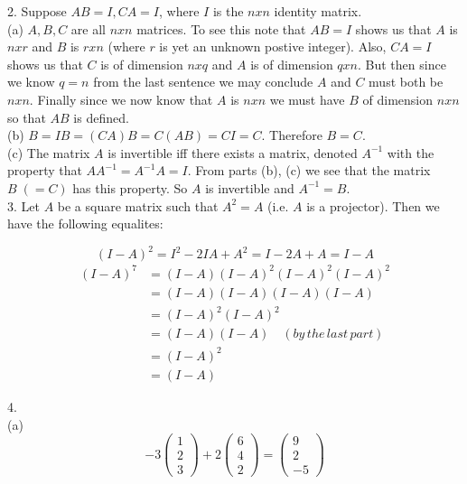 \documentclass[11pt]{article}
\begin{document}
2. Suppose $AB = I, CA = I$, where $I$ is the $nxn$ identity matrix.\\

(a) $A,B,C$ are all $nxn$ matrices. To see this note that $AB = I$ shows us that $A$ is $nxr$ and $B$ is $rxn$ (where $r$ is yet an unknown postive integer). Also, $CA = I$ shows us that $C$ is of dimension $nxq$ and $A$ is of dimension $qxn$. But then since we know $q=n$ from the last sentence we may conclude $A$ and $C$ must both be $nxn$. Finally since we now know that $A$ is $nxn$ we must have $B$ of dimension $nxn$ so that $AB$ is defined.\\

(b) $B = IB = (CA)B = C(AB) = CI = C$. Therefore $B = C$. \\

(c) The matrix $A$ is invertible iff there exists a matrix, denoted $A^{-1}$ with the property that $AA^{-1} = A^{-1}A = I$. From parts (b), (c) we see that the matrix $B \; (=C)$ has this property. So $A$ is invertible and $A^{-1} = B$.\\

3. Let $A$ be a square matrix such that $A^2 = A$ (i.e. $A$ is a projector). Then we have the following equalites:

$$ (I - A)^2 = I^2 - 2IA + A^2 = I - 2A + A = I - A$$
\begin{align*}
(I-A)^7 & = (I-A)(I-A)^2(I-A)^2(I-A)^2 \\ 
&= (I-A)(I-A)(I-A)(I-A) \\
&= (I-A)^2(I-A)^2 \\ 
&= (I-A)(I-A) \quad (by\,the\,last\,part)\\ 
&= (I-A)^2 \\
&= (I-A)
\end{align*}

4.\\

(a)
$$ -3\begin{pmatrix}
1 \\ 2 \\ 3
\end{pmatrix}
+ 2\begin{pmatrix}
6 \\ 4 \\ 2
\end{pmatrix}
= \begin{pmatrix}
9 \\ 2 \\ -5
\end{pmatrix}
$$
\end{document}
